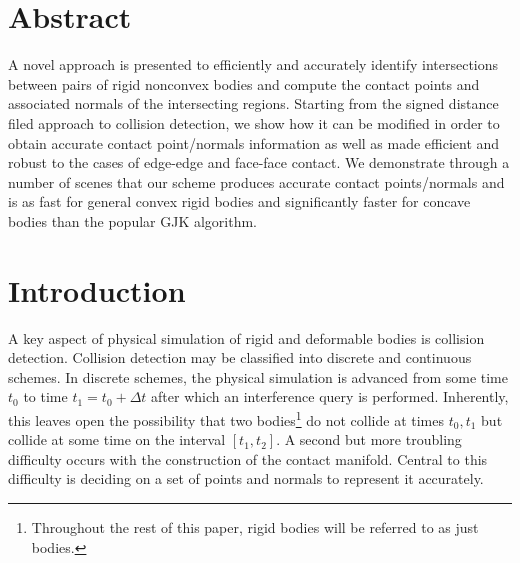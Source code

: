 \documentclass[9pt,twocolumn]{article}
\begin{document}
\setlength{\parindent}{0cm}

\selectfont
{}
\fontsize{10}{10}\selectfont

\title{}
\author{ }
\date{}
\maketitle

\section*{Abstract}

A novel approach is presented to efficiently and accurately identify intersections between pairs of rigid nonconvex bodies and compute the contact points and associated normals of the intersecting regions. Starting from the signed distance filed approach to collision detection, we show how it can be modified in order to obtain accurate contact point/normals information as well as made efficient and robust to the cases of edge-edge and face-face contact. We demonstrate through a number of scenes that our scheme produces accurate contact points/normals and is as fast for general convex rigid bodies and significantly faster for concave bodies than the popular GJK algorithm.

\section{Introduction} 

A key aspect of physical simulation of rigid and deformable bodies is collision detection. Collision detection may be classified into discrete and continuous schemes. In discrete schemes, the physical simulation is advanced from some time $t_0$ to time $t_1 = t_0 + \Delta t$ after which an interference query is performed. Inherently, this leaves open the possibility that two bodies\footnote{Throughout the rest of this paper, rigid bodies will be referred to as just bodies.} do not collide at times $t_0, t_1$ but collide at some time on the interval $[t_1, t_2]$. A second but more troubling difficulty occurs with the construction of the contact manifold. Central to this difficulty is deciding on a set of points and normals to represent it accurately. \newline
\end{document}
